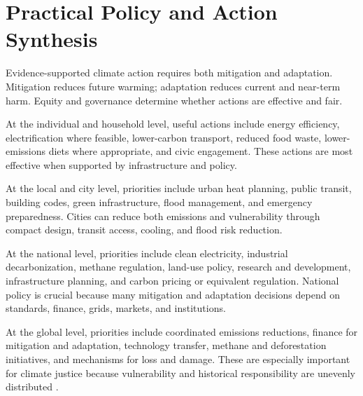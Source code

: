 \documentclass[12pt]{article}
\begin{document}
\section{Practical Policy and Action Synthesis}

Evidence-supported climate action requires both mitigation and adaptation. Mitigation reduces future warming; adaptation reduces current and near-term harm. Equity and governance determine whether actions are effective and fair.

At the individual and household level, useful actions include energy efficiency, electrification where feasible, lower-carbon transport, reduced food waste, lower-emissions diets where appropriate, and civic engagement. These actions are most effective when supported by infrastructure and policy.

At the local and city level, priorities include urban heat planning, public transit, building codes, green infrastructure, flood management, and emergency preparedness. Cities can reduce both emissions and vulnerability through compact design, transit access, cooling, and flood risk reduction.

At the national level, priorities include clean electricity, industrial decarbonization, methane regulation, land-use policy, research and development, infrastructure planning, and carbon pricing or equivalent regulation. National policy is crucial because many mitigation and adaptation decisions depend on standards, finance, grids, markets, and institutions.

At the global level, priorities include coordinated emissions reductions, finance for mitigation and adaptation, technology transfer, methane and deforestation initiatives, and mechanisms for loss and damage. These are especially important for climate justice because vulnerability and historical responsibility are unevenly distributed \cite{ref1}.
\end{document}
